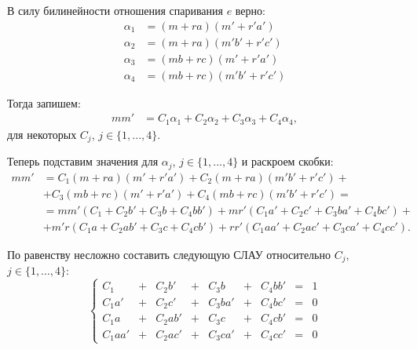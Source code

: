 \documentclass[12pt, a4paper]{extarticle}
\begin{document}
\begin{enumerate}
        В силу билинейности отношения спаривания $e$ верно:
        \begin{equation}
        \begin{split}
            \alpha_1 & = (m + r a)(m' + r' a') \\
            \alpha_2 & = (m + r a)(m' b' + r' c') \\
            \alpha_3 & = (m b + r c)(m' + r' a') \\
            \alpha_4 & = (m b + r c)(m' b' + r' c')
        \end{split}
        \end{equation}
        
        Тогда запишем:
        \begin{equation}
        \begin{split}
            m m' & = C_1 \alpha_1 + C_2 \alpha_2 + C_3 \alpha_3 + C_4 \alpha_4,
        \end{split}
        \end{equation}
        для некоторых $C_j$, $j \in \{1, ..., 4\}$.
        
        Теперь подставим значения для $\alpha_j$, $j \in \{1, ..., 4\}$ и раскроем скобки:
        \begin{equation}
        \begin{split}
            m m' & = C_1 (m + r a)(m' + r' a') + C_2 (m + r a)(m' b' + r' c') + \\
            & + C_3 (m b + r c)(m' + r' a') + C_4 (m b + r c)(m' b' + r' c') = \\
            & = m m' (C_1 + C_2 b' + C_3 b + C_4 b b') + m r' (C_1 a' + C_2 c' + C_3 b a' + C_4 b c') + \\
            & + m' r (C_1 a + C_2 a b' + C_3 c + C_4 c b') + r r' (C_1 a a' + C_2 a c' + C_3 c a' + C_4 c c').
        \end{split}
        \label{eq:mm-equality}
        \end{equation}
        
        По равенству несложно составить следующую СЛАУ относительно $C_j$, $j \in \{1, ..., 4\}$:
        \begin{equation}
            \left\{\begin{array}{lclclclcl}
                C_1      & + & C_2 b'   & + & C_3 b    & + & C_4 b b' & = & 1 \\
                C_1 a'   & + & C_2 c'   & + & C_3 b a' & + & C_4 b c' & = & 0 \\
                C_1 a    & + & C_2 a b' & + & C_3 c    & + & C_4 c b' & = & 0 \\
                C_1 a a' & + & C_2 a c' & + & C_3 c a' & + & C_4 c c' & = & 0
            \end{array}
            \right.
        \label{eq:slae}
        \end{equation}
        

\end{enumerate}
\end{document}
